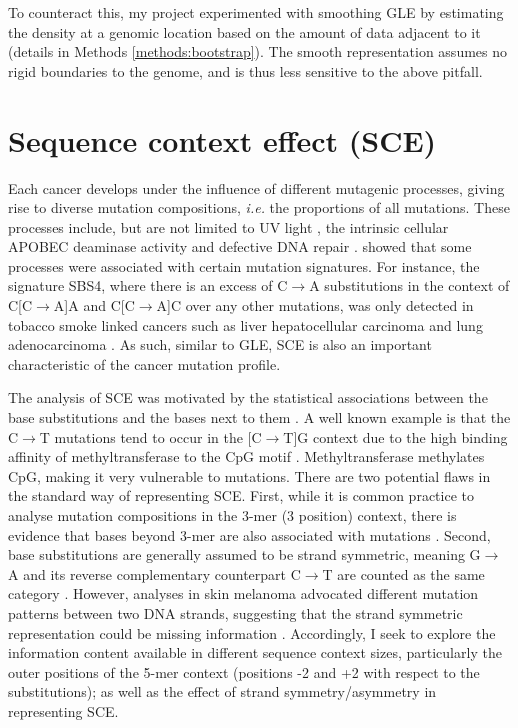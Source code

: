 To counteract this, my project experimented with smoothing GLE by estimating the \gls{density} at a genomic location based on the amount of data adjacent to it (details in Methods \ref{methods:bootstrap}). The smooth representation assumes no rigid boundaries to the genome, and is thus less sensitive to the above pitfall. 



\section{Sequence context effect (SCE)}
\label{intro:sce}

Each cancer develops under the influence of different mutagenic processes, giving rise to diverse mutation compositions, \textit{i.e.} the proportions of all mutations. These processes include, but are not limited to UV light \citep[known to drive skin melanoma;][]{Mohania2017}, the intrinsic cellular APOBEC deaminase activity \citep[\textit{e.g.} in B cells;][]{Kuppers2005MechanismsPathogenesis} and defective DNA repair \citep[\textit{e.g.} mutated \textit{BRCA} genes in breast cancer;][]{Navasardyan2021YY1TNBC}. \citet{Alexandrov2013, Alexandrov2020} showed that some processes were associated with certain mutation signatures. For instance, the signature SBS4, where there is an excess of C$\rightarrow$A substitutions in the context of C[C$\rightarrow$A]A and C[C$\rightarrow$A]C over any other mutations, was only detected in tobacco smoke linked cancers such as liver hepatocellular carcinoma and lung adenocarcinoma \citep{Alexandrov2020}. As such, similar to GLE, SCE is also an important characteristic of the cancer mutation profile. 

The analysis of SCE was motivated by the statistical associations between the base substitutions and the \glspl{base} next to them \citep{Zhu2017}. A well known example is that the C$\rightarrow$T mutations tend to occur in the [C$\rightarrow$T]G context due to the high binding affinity of methyltransferase to the CpG motif \citep[Figure \ref{fig:motif_demo};][]{Cooper2010}. Methyltransferase methylates CpG, making it very vulnerable to mutations. There are two potential flaws in the standard way of representing SCE. First, while it is common practice to analyse mutation compositions in the 3-mer (3 position) context, there is evidence that bases beyond 3-mer are also associated with mutations \citep{Zhu2017,Zhu2020}. Second, base substitutions are generally assumed to be strand symmetric, meaning G$\rightarrow$A and its reverse complementary counterpart C$\rightarrow$T are counted as the same category \citep[Figure \ref{fig:motif_symmetric_demo};][]{Alexandrov2013, Jiao2020}. However, analyses in skin melanoma advocated different mutation patterns between two DNA strands, suggesting that the strand symmetric representation could be missing information \citep{Zhu2017}. Accordingly, I seek to explore the information content available in different sequence context sizes, particularly the outer positions of the 5-mer context (positions -2 and +2 with respect to the substitutions); as well as the effect of strand symmetry/asymmetry in representing SCE.

